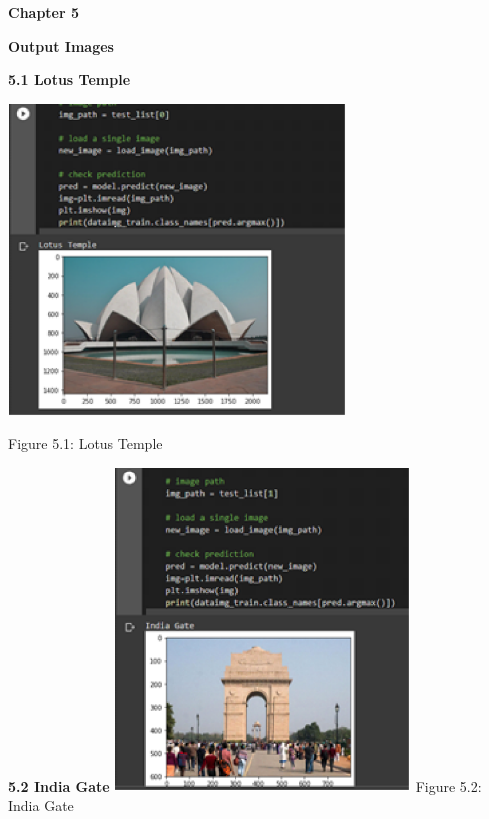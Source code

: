 \documentclass[10pt]{article} %
\begin{document}
\noindent  \begin{center}\textbf {Chapter 5} \end{center}

\noindent \textbf{}

\noindent \textbf{}

\noindent \begin{center} \textbf{Output Images}\end{center}

\noindent \textbf{}

\noindent 

\noindent \textbf{5.1 Lotus Temple}

\noindent \textbf{}

\noindent \includegraphics*[width=3.53in, height=3.25in, keepaspectratio=false]{image8}

\noindent 

\noindent Figure 5.1: Lotus Temple

\noindent 

\noindent 
\newpage
\noindent \textbf{5.2 India Gate}
\newline
\newline
\noindent \includegraphics*[width=3.09in, height=3.37in, keepaspectratio=false]{image9}\textbf{ } \newline Figure 5.2: India Gate
\end{document}
